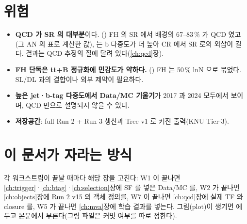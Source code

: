 \section{위험}\label{sec:plan-risk}

\begin{itemize}
\item \textbf{QCD 가 SR 의 대부분}이다. \ttH(\bbbar) FH 의 SR 에서 배경의 67–83\,\% 가 QCD 였고(그 AN 의 표로 계산한 값),
\ttHH{} 는 b 다중도가 더 높아 CR 에서 SR 로의 외삽이 길다. 결과는 QCD 추정의 질에 달려 있다(\ref{ch:qcd}장).
\item \textbf{FH 단독은 tt+B 정규화에 민감도가 약하다.} \ttH(\bbbar) FH 는 50\,\% lnN 으로 묶었다. SL/DL 과의 결합이나
외부 제약이 필요하다.
\item \textbf{높은 jet·b-tag 다중도에서 Data/MC 기울기}가 2017 과 2024 모두에서 보이며, QCD 만으로 설명되지 않을 수 있다.
\item \textbf{저장공간}: full Run 2 + Run 3 생산과 Tree v1 로 커진 출력(KNU Tier-3).
\end{itemize}

\section{이 문서가 자라는 방식}\label{sec:plan-an}

각 워크스트림이 끝날 때마다 해당 장을 고친다: W1 이 끝나면 \ref{ch:trigger}·\ref{ch:btag}·\ref{ch:selection}장에 SF 를 넣은 Data/MC 를,
W2 가 끝나면 \ref{ch:objects}장에 Run 2 v15 의 객체 정의를, W7 이 끝나면 \ref{ch:qcd}장에 실제 TF 와 closure 를, W5 가 끝나면
\ref{ch:mva}장에 학습 결과를 넣는다. 그림(plot)이 생기면  에 두고 본문에서 부른다(그림 파일은 커밋 여부를
따로 정한다).

